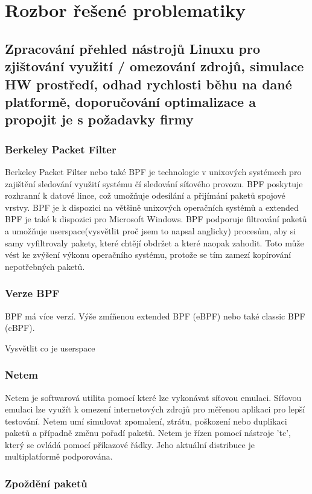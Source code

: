 \chapter{Rozbor řešené problematiky}

\section{Zpracování přehled nástrojů Linuxu pro zjištování využití / omezování zdrojů, simulace HW prostředí, odhad rychlosti běhu na dané platformě, doporučování optimalizace a propojit je s požadavky firmy}

\subsection{Berkeley Packet Filter}

Berkeley Packet Filter nebo také BPF je technologie v unixových systémech pro zajištění sledování využití systému čí sledování síťového provozu.
BPF poskytuje rozhranní k datové lince, což umožňuje odesílání a přijímání paketů spojové vrstvy. BPF je k dispozici na většině unixových operačních systémů
a extended BPF je také k dispozici pro Microsoft Windows. BPF podporuje filtrování paketů a umožňuje userspace(vysvětlit proč jsem to napsal anglicky) procesům,
aby si samy vyfiltrovaly pakety, které chtějí obdržet a které naopak zahodit. Toto může vést ke zvýšení výkonu operačního systému, protože se tím zamezí kopírování nepotřebných paketů.

\subsection*{Verze BPF}
BPF má více verzí. Výše zmíňenou extended BPF (eBPF) nebo také classic BPF (cBPF).

Vysvětlit co je userspace

\subsection{Netem}
Netem je softwarová utilita pomocí které lze vykonávat síťovou emulaci. Síťovou emulaci lze využít k omezení internetových zdrojů pro měřenou aplikaci pro lepší testování.
Netem umí simulovat zpomalení, ztrátu, poškození nebo duplikaci paketů a případně změnu pořadí paketů. Netem je řízen pomocí nástroje 'tc', který se ovládá pomocí příkazové řádky.
Jeho aktuální distribuce je multiplatformě podporována.

\subsection*{Zpoždění paketů}


